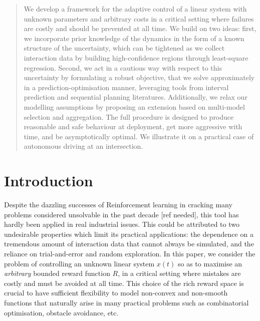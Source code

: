 \documentclass{article}
\begin{document}
\begin{abstract}
	We develop a framework for the adaptive control of a linear system with unknown parameters and arbitrary costs in a critical setting where failures are costly and should be prevented at all time. We build on two ideas: first, we incorporate prior knowledge of the dynamics in the form of a known structure of the uncertainty, which can be tightened as we collect interaction data by building high-confidence regions through least-square regression. Second, we act in a cautious way with respect to this uncertainty by formulating a robust objective, that we solve approximately in a prediction-optimisation manner, leveraging tools from interval prediction and sequential planning literatures. Additionally, we relax our modelling assumptions by proposing an extension based on multi-model selection and aggregation. The full procedure is designed to produce reasonable and safe behaviour at deployment, get more aggressive with time, and be asymptotically optimal. We illustrate it on a practical case of autonomous driving at an intersection.
\end{abstract}	

\section{Introduction}

Despite the dazzling successes of Reinforcement learning in cracking many problems considered unsolvable in the past decade [ref needed], this tool has hardly been applied in real industrial issues. This could be attributed to two undesirable properties which limit its practical applications: the dependence on a tremendous amount of interaction data that cannot always be simulated, and the reliance on trial-and-error and random exploration. In this paper, we consider the problem of controlling an unknown linear system $x(t)$ so as to maximise an \emph{arbitrary} bounded reward function $R$, in a critical setting where mistakes are costly and must be avoided at all time. 
This choice of the rich reward space is crucial to have sufficient flexibility to model non-convex and non-smooth functions that naturally arise in many practical problems such as combinatorial optimisation, obstacle avoidance, etc. 
\end{document}
